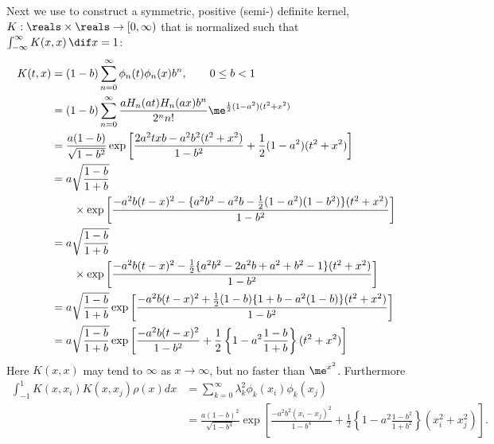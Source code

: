 \documentclass[]{elsarticle}
\theoremstyle{definition}
\begin{document}
Next we use \label{Poissonkern} to construct a symmetric, positive (semi-) definite kernel, $K:\reals \times \reals \to [0,\infty)$ that is normalized such that $\int_{-\infty}^{\infty} K(x,x) \, \dif x =1$:
\begin{align}
\nonumber
K(t,x) & = (1-b) \sum_{n=0}^{\infty} \phi_n(t)\phi_n(x) b^n, \qquad 0 \le b < 1\\
\nonumber
& = (1-b) \sum_{n=0}^{\infty} \frac{a H_n(at) H_n(ax)  b^n}{2^n n!} \me^{\frac 12 (1-a^2)(t^2+x^2)}\\
\nonumber
& = \frac{a(1-b)}{\sqrt{1-b^2}} \exp\left[\frac{2a^2txb -a^2b^2(t^2+x^2)}{1-b^2} + \frac 12 (1-a^2)(t^2+x^2) \right]\\
\nonumber
& = a\sqrt{\frac{1-b}{1+b}} \\
\nonumber
& \qquad \times \exp\left[\frac{-a^2b(t-x)^2-\{a^2b^2-a^2b - \frac12 (1-a^2)(1-b^2)\} (t^2+x^2)}{1-b^2} \right]\\
\nonumber
& = a\sqrt{\frac{1-b}{1+b}} \\
\nonumber
& \qquad \times \exp\left[\frac{-a^2b(t-x)^2-\frac12\{a^2b^2-2a^2b + a^2 + b^2 - 1\} (t^2+x^2)}{1-b^2} \right]\\
\nonumber
& = a\sqrt{\frac{1-b}{1+b}} \exp\left[\frac{-a^2b(t-x)^2+\frac12(1-b)\{1+ b - a^2(1-b)\} (t^2+x^2)}{1-b^2} \right]\\
& = a\sqrt{\frac{1-b}{1+b}} \exp\left[\frac{-a^2b(t-x)^2}{1-b^2} +\frac12\left\{1 - a^2\frac{1-b}{1+b} \right\} (t^2+x^2) \right] \label{Kernelab}
\end{align}
Here $K(x,x)$ may tend to $\infty$ as $x \to \infty$, but no faster than $\me^{x^2}$. Furthermore
\begin{align*}
\int_{-1}^1K(x,x_i)K(x,x_j)\rho(x)dx &= \sum_{k=0}^\infty\lambda_k^2\phi_k(x_i)\phi_k(x_j)\\
&= \frac{a(1-b)^2}{\sqrt{1-b^4}}\exp\left[\frac{-a^2b^2(x_i-x_j)^2}{1-b^4} +\frac12\left\{1 - a^2\frac{1-b^2}{1+b^2} \right\} (x_i^2+x_j^2) \right].
\end{align*}
\end{document}

